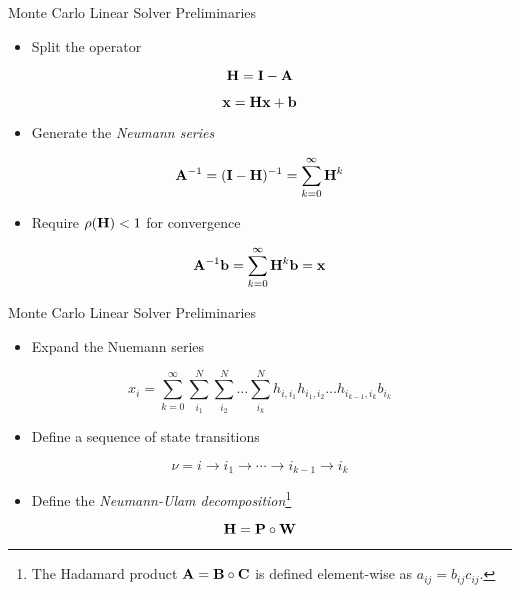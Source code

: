 \documentclass{beamer}
\begin{document}
\begin{frame}{Monte Carlo Linear Solver Preliminaries}

  \begin{itemize}
  \item Split the operator
  \end{itemize}

  \[
  \mathbf{H} = \mathbf{I} - \mathbf{A}
  \]

  \[
  \mathbf{x} = \mathbf{H} \mathbf{x} + \mathbf{b}
  \]

  \begin{itemize}
  \item Generate the \textit{Neumann series}
  \end{itemize}
  
  \[
  \mathbf{A}^{-1} = (\mathbf{I}-\mathbf{H})^{-1} = \sum_{k=0}^{\infty} \mathbf{H}^k
  \]

  \begin{itemize}
  \item Require $\rho(\mathbf{H}) < 1$ for convergence
  \end{itemize}

  \[
  \mathbf{A}^{-1}\mathbf{b} = \sum_{k=0}^{\infty} \mathbf{H}^k\mathbf{b} = \mathbf{x}
  \]

\end{frame}

\begin{frame}{Monte Carlo Linear Solver Preliminaries}

  \begin{itemize}
  \item Expand the Nuemann series
  \end{itemize}

  \[
  x_i = \sum_{k=0}^{\infty}\sum_{i_1}^{N}\sum_{i_2}^{N}\ldots
  \sum_{i_k}^{N}h_{i,i_1}h_{i_1,i_2}\ldots h_{i_{k-1},i_k}b_{i_k}
  \]

  \begin{itemize}
  \item Define a sequence of state transitions
  \end{itemize}
  
  \[
  \nu = i \rightarrow i_1 \rightarrow \cdots \rightarrow i_{k-1}
  \rightarrow i_{k}
  \]

  \begin{itemize}
  \item Define the \textit{Neumann-Ulam decomposition}\footnote{The
    Hadamard product $\mathbf{A} = \mathbf{B} \circ \mathbf{C}$ is defined
    element-wise as $a_{ij} = b_{ij} c_{ij}$.}
  \end{itemize}

  \[
  \mathbf{H} = \mathbf{P} \circ \mathbf{W}
  \]

\end{frame}
\end{document}
